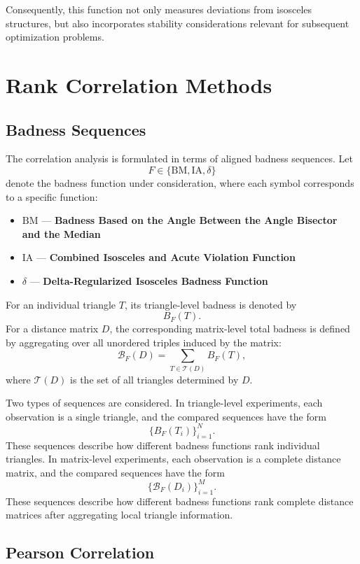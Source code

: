 \documentclass[11pt]{article}
\begin{document}
Consequently, this function not only measures deviations from isosceles structures, but also incorporates stability considerations relevant for subsequent optimization problems.

\section{Rank Correlation Methods}
\label{sec:rank_correlation_methods}

\subsection{Badness Sequences}

The correlation analysis is formulated in terms of aligned badness sequences. Let
\[
F\in\{\mathrm{BM},\mathrm{IA},\delta\}
\]
denote the badness function under consideration, where each symbol corresponds to a specific function:  

\begin{itemize}
    \item \(\mathrm{BM}\) --- \textbf{Badness Based on the Angle Between the Angle Bisector and the Median}  
    \item \(\mathrm{IA}\) --- \textbf{Combined Isosceles and Acute Violation Function}  
    \item \(\delta\) --- \textbf{Delta-Regularized Isosceles Badness Function}  
\end{itemize}

For an individual triangle \(T\), its triangle-level badness is denoted by
\[
B_F(T).
\]
For a distance matrix \(D\), the corresponding matrix-level total badness is defined by aggregating over all unordered triples induced by the matrix:
\[
\mathcal{B}_F(D)
=
\sum_{T\in\mathcal{T}(D)} B_F(T),
\]
where \(\mathcal{T}(D)\) is the set of all triangles determined by \(D\).

Two types of sequences are considered. In triangle-level experiments, each observation is a single triangle, and the compared sequences have the form
\[
\{B_F(T_i)\}_{i=1}^{N}.
\]
These sequences describe how different badness functions rank individual triangles. In matrix-level experiments, each observation is a complete distance matrix, and the compared sequences have the form
\[
\{\mathcal{B}_F(D_i)\}_{i=1}^{M}.
\]
These sequences describe how different badness functions rank complete distance matrices after aggregating local triangle information.

\subsection{Pearson Correlation}
\end{document}
